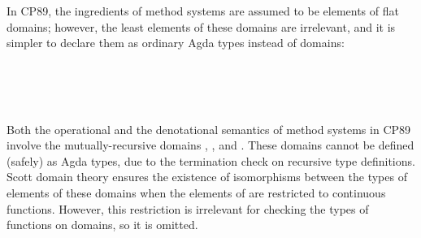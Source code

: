 \begin{AgdaAlign}
In CP89, the ingredients of method systems are assumed to be elements of flat domains;
however, the least elements of these domains are irrelevant,
and it is simpler to declare them as ordinary Agda types instead of domains:
%
\begin{code}%
%
\>[4]\AgdaSymbol{(}\AgdaSpace{}%
%
\>[17]\AgdaSymbol{:}\AgdaSpace{}%
\AgdaSpace{}%
\AgdaSymbol{)}%
\>[32]\<%
\\
%
\>[4]\AgdaSymbol{(}\AgdaSpace{}%
%
\>[17]\AgdaSymbol{:}\AgdaSpace{}%
\AgdaSpace{}%
\AgdaSymbol{)}%
\>[32]\<%
\\
%
\>[4]\AgdaSymbol{(}\AgdaSpace{}%
%
\>[17]\AgdaSymbol{:}\AgdaSpace{}%
\AgdaSpace{}%
\AgdaSymbol{)}%
\>[32]\<%
\\
%
\>[4]\AgdaSymbol{(}\AgdaSpace{}%
%
\>[17]\AgdaSymbol{:}\AgdaSpace{}%
\AgdaSpace{}%
\AgdaSymbol{)}%
\>[32]\<%
\end{code}
%
Both the operational and the denotational semantics of method systems in CP89 involve
the mutually-recursive domains , , and .
These domains cannot be defined (safely) as Agda types,
due to the termination check on recursive type definitions.
Scott domain theory ensures the existence of isomorphisms between the types of elements of these domains
when the elements of  are restricted to continuous functions.
However, this restriction is irrelevant for checking the types of functions on domains,
so it is omitted.
%
\begin{code}%
%
\>[4]\AgdaSymbol{(}\AgdaSpace{}%
%
\>[16]\AgdaSymbol{:}\AgdaSpace{}%
\AgdaSpace{}%
\AgdaSymbol{)}%
\>[32]\<%
\\
%
\>[4]\AgdaSymbol{(}\AgdaSpace{}%
%
\>[16]\AgdaSymbol{:}\AgdaSpace{}%
\AgdaSpace{}%
\AgdaSymbol{)}%
\>[32]\<%
\\
%
\>[4]\AgdaSymbol{(}\AgdaSpace{}%
%
\>[16]\AgdaSymbol{:}\AgdaSpace{}%
\AgdaSpace{}%
\AgdaSymbol{)}%
\>[32]\<%
\\

\end{code}
\end{AgdaAlign}
